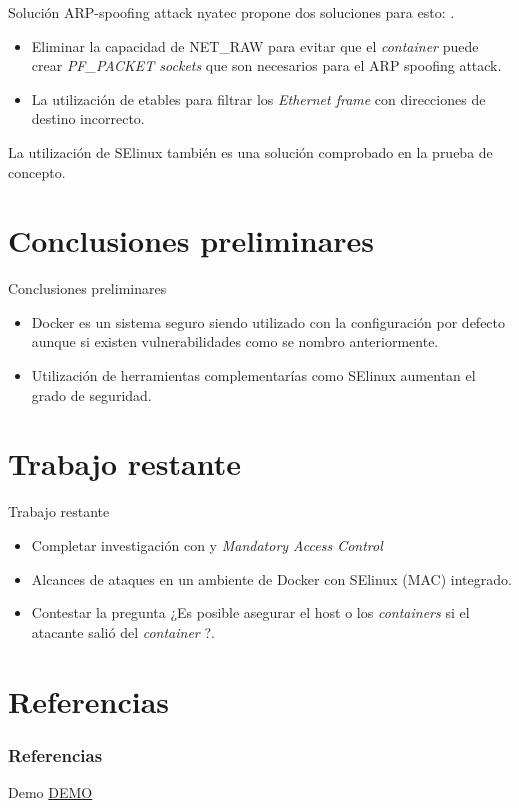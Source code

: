 \documentclass{bredelebeamer}
\newcommand{\container}{\textit{container }}
\newcommand{\containers}{\textit{containers }}
\begin{document}
\begin{frame}{Solución ARP-spoofing attack}
nyatec propone dos soluciones para esto: \cite{nyantec:2015:Online}.

 \begin{itemize}
 	\item Eliminar la capacidad 
de NET\_RAW para evitar que el \container puede crear \textit{PF\_PACKET sockets} 
que son necesarios para el ARP spoofing attack.
 	\item La utilización de etables para 
filtrar los \textit{Ethernet frame} con direcciones de destino incorrecto.
 \end{itemize}

La utilización de SElinux también es una solución comprobado en la prueba de concepto.
\end{frame}

	  

\section{Conclusiones preliminares}

\begin{frame}{Conclusiones preliminares}

\begin{itemize}
	\item Docker es un sistema seguro siendo utilizado con la configuración por defecto aunque si existen vulnerabilidades como se nombro anteriormente.
	\item Utilización de herramientas complementarías como SElinux aumentan el grado de seguridad.
\end{itemize}
\end{frame}


\section{Trabajo restante}


\begin{frame}{Trabajo restante}
	\begin{itemize}
	\item Completar investigación con  y \textit{Mandatory Access Control}
	\item Alcances de ataques en un ambiente de Docker con SElinux (MAC) integrado.
	\item Contestar la pregunta ¿Es posible asegurar el host o los \containers  si el atacante salió del \container?.
\end{itemize}
\end{frame}

\section{Referencias}
\begin{frame}[allowframebreaks]
\frametitle{Referencias}


\end{frame}

\begin{frame}{Demo}
\href{https://www.youtube.com/watch?v=QuyzNybkBYI}{DEMO}
\end{frame}
\end{document}
